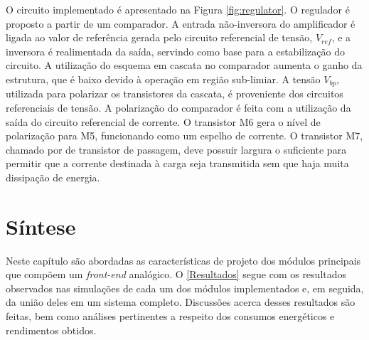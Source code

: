 O circuito implementado é apresentado na Figura \ref{fig:regulator}. O regulador é proposto a partir de um comparador. A entrada não-inversora do amplificador é ligada ao valor de referência gerada pelo circuito referencial de tensão, $V_{ref}$, e a inversora é realimentada da saída, servindo como base para a estabilização do circuito. A utilização do esquema em cascata no comparador aumenta o ganho da estrutura, que é baixo devido à operação em região sub-limiar. A tensão $V_{bp}$, utilizada para polarizar os transistores da cascata, é proveniente dos circuitos referenciais de tensão. A polarização do comparador é feita com a utilização da saída do circuito referencial de corrente. O transistor {M6} gera o nível de polarização para {M5}, funcionando como um espelho de corrente. O transistor {M7}, chamado por  de transistor de passagem, deve possuir largura o suficiente para permitir que a corrente destinada à carga seja transmitida sem que haja muita dissipação de energia.


\section{Síntese}
Neste capítulo são abordadas as características de projeto dos módulos principais que compõem um \textit{front-end} analógico. O \autoref{Resultados} segue com os resultados observados nas simulações de cada um dos módulos implementados e, em seguida, da união deles em um sistema completo. Discussões acerca desses resultados são feitas, bem como análises pertinentes a respeito dos consumos energéticos e rendimentos obtidos.




